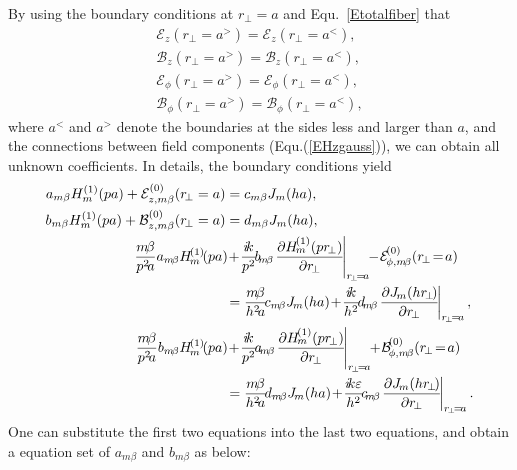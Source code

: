 By using the boundary conditions at $ r\!_\perp=a $ and Equ.~\ref{Etotalfiber} that
\begin{align}
\mathcal{E}_{z}(r\!_\perp =a^> ) = \mathcal{E}_{z}(r\!_\perp =a^< ),\\
\mathcal{B}_{z}(r\!_\perp =a^> ) = \mathcal{B}_{z}(r\!_\perp =a^< ),\\
\mathcal{E}_{\phi}(r\!_\perp =a^> ) = \mathcal{E}_{\phi}(r\!_\perp =a^< ),\\
\mathcal{B}_{\phi}(r\!_\perp =a^> ) = \mathcal{B}_{\phi}(r\!_\perp =a^< ),
\end{align}
where $ a^< $ and $ a^> $ denote the boundaries at the sides less and larger than $ a $, and the connections between field components (Equ.(\ref{EHzgauss})), we can obtain all unknown coefficients. In details, the boundary conditions yield
\begin{align}
a_{m\beta}H_m^{(1)}(pa)+\mathcal{E}_{z,m\beta}^{(0)}(r\!_\perp =a ) &= c_{m\beta}J_m(ha),\\
b_{m\beta}H_m^{(1)}(pa)+\mathcal{B}_{z,m\beta}^{(0)}(r\!_\perp =a ) &= d_{m\beta}J_m(ha),\\
\frac{m\! \beta}{p^2\! a}a_{m\!\beta} H\!_m^{(1)}\!(pa)\! &+\! \frac{i\!k}{p^2}\! b\!_{m\!\beta}\! \left. \pp{H\!_m^{( 1 )}(p r\!_\perp)}{r\!_\perp}\! \right|_{r\!_\perp\! =\! a}\!\! -\! \mathcal{E}\! _{\phi,m\! \beta}^{(0)}(r\!_\perp\! =\! a ) \nonumber \\
&= \frac{m\! \beta}{h^2\! a}\! c_{m\! \beta} J\!_m(ha)\! +\! \frac{i\!k}{h^2}\!d\!_{m\!\beta} \! \left. \pp{J\!_m(h r\!_\perp \!)}{r\!_\perp}\! \right|_{r\!_\perp\! =\! a},\\
\frac{m\! \beta}{p^2\! a}b_{m\!\beta} H\!_m^{(1)}\!(pa)\! &+\! \frac{i\!k}{p^2}\! a\!_{m\!\beta}\! \left. \pp{H\!_m^{( 1 )}(p r\!_\perp)}{r\!_\perp}\! \right|_{r\!_\perp\! =\! a}\!\! +\! \mathcal{B}\! _{\phi,m\! \beta}^{(0)}(r\!_\perp\! =\! a ) \nonumber \\
&= \frac{m\! \beta}{h^2\! a}\! d_{m\! \beta} J\!_m(ha)\! +\! \frac{i\!k\varepsilon}{h^2}\!c\!_{m\!\beta} \! \left. \pp{J\!_m(h r\!_\perp \!)}{r\!_\perp}\! \right|_{r\!_\perp\! =\! a}.
\end{align}
One can substitute the first two equations into the last two equations, and obtain a equation set of $a_{m\beta}$ and $b_{m\beta}$ as below:
